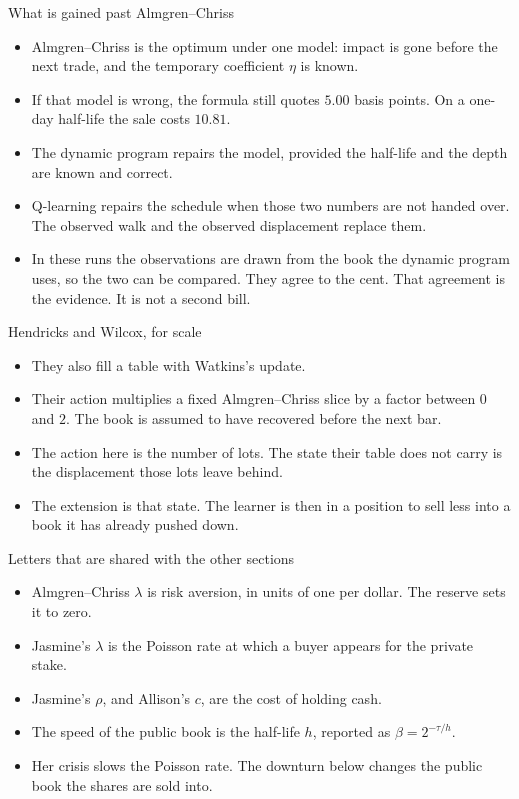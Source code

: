 \documentclass[aspectratio=169,10pt]{beamer}
\newcommand{\currentsource}{}
\newcommand{\framesource}[1]{\gdef\currentsource{#1}}
\newcommand{\aiassisted}{AI assisted, via Grok 4.7}
\begin{document}
\begin{frame}{What is gained past Almgren--Chriss}
\framesource{\aiassisted}
\begin{itemize}
\item Almgren--Chriss is the optimum under one model: impact is gone before the next trade, and the temporary coefficient \(\eta\) is known.
\item If that model is wrong, the formula still quotes \(5.00\) basis points. On a one-day half-life the sale costs \(10.81\).
\item The dynamic program repairs the model, provided the half-life and the depth are known and correct.
\item Q-learning repairs the schedule when those two numbers are not handed over. The observed walk and the observed displacement replace them.
\item In these runs the observations are drawn from the book the dynamic program uses, so the two can be compared. They agree to the cent. That agreement is the evidence. It is not a second bill.
\end{itemize}
\end{frame}

\begin{frame}{Hendricks and Wilcox, for scale}
\framesource{Hendricks and Wilcox, 2014}
\begin{itemize}
\item They also fill a table with Watkins's update.
\item Their action multiplies a fixed Almgren--Chriss slice by a factor between \(0\) and \(2\). The book is assumed to have recovered before the next bar.
\item The action here is the number of lots. The state their table does not carry is the displacement those lots leave behind.
\item The extension is that state. The learner is then in a position to sell less into a book it has already pushed down.
\end{itemize}
\end{frame}

\begin{frame}{Letters that are shared with the other sections}
\framesource{Allison Duffy and Jasmine Li; Almgren and Chriss, 2001}
\begin{itemize}
\item Almgren--Chriss \(\lambda\) is risk aversion, in units of one per dollar. The reserve sets it to zero.
\item Jasmine's \(\lambda\) is the Poisson rate at which a buyer appears for the private stake.
\item Jasmine's \(\rho\), and Allison's \(c\), are the cost of holding cash.
\item The speed of the public book is the half-life \(h\), reported as \(\beta=2^{-\tau/h}\).
\item Her crisis slows the Poisson rate. The downturn below changes the public book the shares are sold into.
\end{itemize}
\end{frame}
\end{document}
